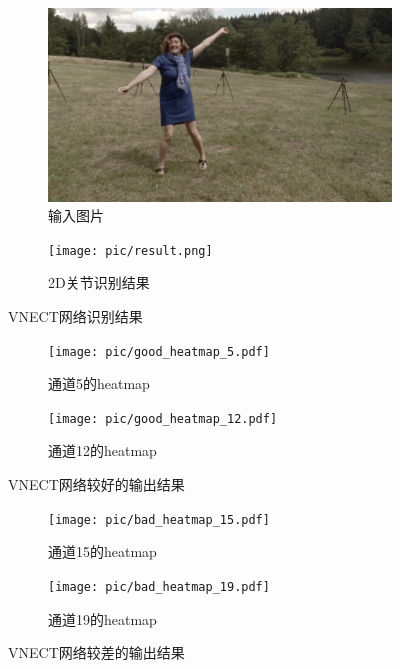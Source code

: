 \documentclass[a4paper, 10pt]{article}
\begin{document}
\begin{figure}[!ht]
        \begin{subfigure}[b]{0.48\linewidth}
                \includegraphics[width=\linewidth]{pic/input.jpg}
                \caption{输入图片}
                \label{pic:input}
        \end{subfigure}
        \hfill
        \begin{subfigure}[b]{0.48\linewidth}
                \texttt{[image: pic/result.png]}
                \caption{2D关节识别结果}
                \label{pic:result}
        \end{subfigure}
        \caption{VNECT网络识别结果}
\end{figure}

\begin{figure}[!ht]
        \begin{subfigure}[b]{0.48\linewidth}
                \texttt{[image: pic/good\_heatmap\_5.pdf]}
                \caption{通道5的heatmap}
                \label{pic:good5}
        \end{subfigure}
        \hfill
        \begin{subfigure}[b]{0.48\linewidth}
                \texttt{[image: pic/good\_heatmap\_12.pdf]}
                \caption{通道12的heatmap}
                \label{pic:good12}
        \end{subfigure}
        \caption{VNECT网络较好的输出结果\label{pic:good}}
\end{figure}

\begin{figure}[!ht]
        \begin{subfigure}[b]{0.48\linewidth}
                \texttt{[image: pic/bad\_heatmap\_15.pdf]}
                \caption{通道15的heatmap}
                \label{pic:bad15}
        \end{subfigure}
        \hfill
        \begin{subfigure}[b]{0.48\linewidth}
                \texttt{[image: pic/bad\_heatmap\_19.pdf]}
                \caption{通道19的heatmap}
                \label{pic:bad19}
        \end{subfigure}
        \caption{VNECT网络较差的输出结果 \label{pic:bad}}
\end{figure}
\end{document}
